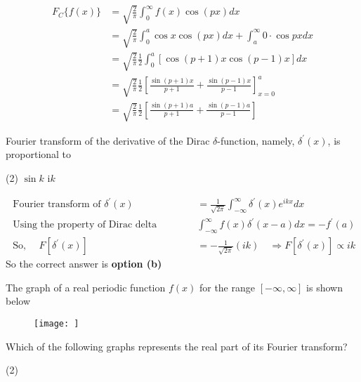 \begin{answer}
	\begin{align*}
	F_{C}\{f(x)\} &=\sqrt{\frac{2}{\pi}} \int_{0}^{\infty} f(x) \cos (p x) d x \\
	&=\sqrt{\frac{2}{\pi}} \int_{0}^{a} \cos x \cos (p x) d x+\int_{a}^{\infty} 0 \cdot \cos p x d x \\
	&=\sqrt{\frac{2}{\pi}} \frac{1}{2} \int_{0}^{a}[\cos (p+1) x \cos (p-1) x] d x\\
	&=\sqrt{\frac{2}{\pi}} \frac{1}{2}\left[\frac{\sin (p+1) x}{p+1}+\frac{\sin (p-1) x}{p-1}\right]_{x=0}^{a} \\
	&=\sqrt{\frac{2}{\pi}} \frac{1}{2}\left[\frac{\sin (p+1) a}{p+1}+\frac{\sin (p-1) a}{p-1}\right]
	\end{align*}
\end{answer}
\begin{exercise}
	Fourier transform of the derivative of the Dirac $\delta$-function, namely, $\delta^{\prime}(x)$, is proportional to
	 \begin{tasks}(2)
		\task[\textbf{c.}] $\sin k$
		\task[\textbf{d.}] $\mathrm{i} k$
	\end{tasks}
\end{exercise}
\begin{answer}
	\begin{align*}
	\text { Fourier transform of } \delta^{\prime}(x)&=\frac{1}{\sqrt{2 \pi}} \int_{-\infty}^{\infty} \delta^{\prime}(x) e^{i k x} d x\\
	\text { Using the property of Dirac delta function }& \int_{-\infty}^{\infty} f(x) \delta^{\prime}(x-a) d x=-f^{\prime}(a)\\
	\text { So, } \quad F\left[\delta^{\prime}(x)\right]&=-\frac{1}{\sqrt{2 \pi}}(i k) \quad \Rightarrow F\left[\delta^{\prime}(x)\right] \propto i k
	\end{align*}
	So the correct answer is \textbf{option (b)}
\end{answer}
\begin{exercise}
	The graph of a real periodic function $f(x)$ for the range $[-\infty, \infty]$ is shown below
	\begin{figure}[H]
		\centering
		\texttt{[image: ]}
		\caption{}
		\label{}
	\end{figure}
	Which of the following graphs represents the real part of its Fourier transform?
	 \begin{tasks}(2)
		\task[\textbf{a.}]
		\task[\textbf{b.}]
		\task[\textbf{c.}]
		\task[\textbf{d.}] 
	\end{tasks}
\end{exercise}
